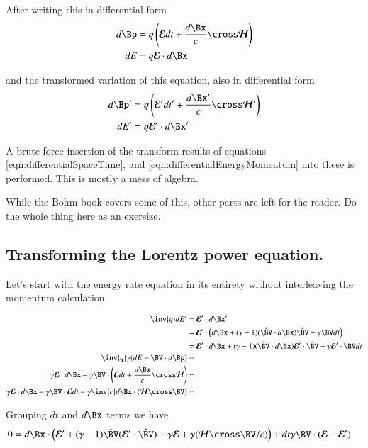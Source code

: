 \documentclass{article}
\newcommand{\EE}[0]{\boldsymbol{\mathcal{E}}}
\newcommand{\HH}[0]{\boldsymbol{\mathcal{H}}}
\newcommand{\Vcap}[0]{\hat{\BV}}
\begin{document}
After writing this
in differential form
\begin{align}\label{eqn:untransformedLorentzForce}
d\Bp &= q \left( \EE dt + \frac{d\Bx}{c} \cross \HH \right) \\
dE &= q \EE \cdot d\Bx
\end{align}

and the transformed variation of this equation, also in differential form
\begin{align}\label{eqn:transformedLorentzForce}
d\Bp' &= q \left( \EE' dt' + \frac{d\Bx'}{c} \cross \HH' \right) \\
dE' &= q \EE' \cdot d\Bx'
\end{align}

A brute force insertion of the transform results of equations
\ref{eqn:differentialSpaceTime}, and \ref{eqn:differentialEnergyMomentum} into these is performed.  This is mostly
a mess of algebra.  

While the Bohm book covers some of this, other parts are left for the reader.  Do the whole thing here as an exersize.

\subsection{ Transforming the Lorentz power equation. }

Let's start with the energy rate equation in its entirety without interleaving the momentum calculation.

\begin{align*}
\inv{q} dE' 
&= \EE' \cdot d\Bx' \\
&= \EE' \cdot \left( d\Bx + (\gamma-1)(\Vcap \cdot d\Bx) \Vcap - \gamma \BV dt \right) \\
&= \EE' \cdot d\Bx + (\gamma-1)(\Vcap \cdot d\Bx) \EE' \cdot \Vcap - \gamma \EE' \cdot \BV dt \\
\inv{q}\gamma ( dE - \BV \cdot d\Bp ) &= \\
\gamma \EE \cdot d\Bx - \gamma \BV \cdot \left(\EE dt + \frac{d\Bx}{c} \cross \HH \right) &= \\
\gamma \EE \cdot d\Bx 
- \gamma \BV \cdot \EE dt 
- \gamma \inv{c} d\Bx \cdot (\HH \cross \BV) &= \\
\end{align*}

Grouping $dt$ and $d\Bx$ terms we have
\begin{align*}
0 &= 
d\Bx \cdot \left(
\EE' + (\gamma-1) \Vcap (\EE' \cdot \Vcap)
-\gamma \EE 
+ \gamma (\HH \cross \BV/c) 
\right)
+ dt \gamma \BV \cdot (\EE - \EE')
\end{align*}
\end{document}
